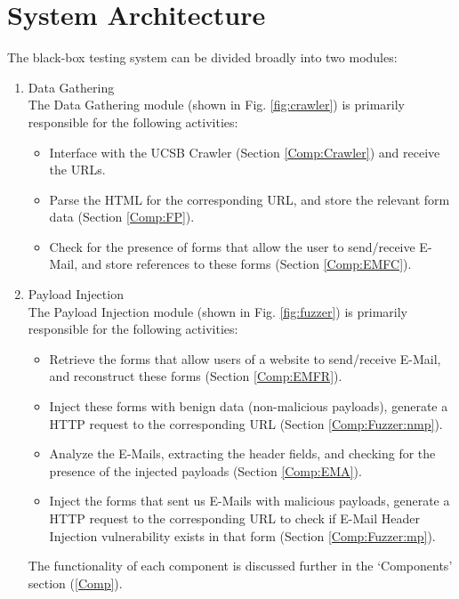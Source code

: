 \section{System Architecture}

The black-box testing system can be divided broadly into two modules:
\begin{enumerate}
	\item Data Gathering\\
		The Data Gathering module (shown in Fig. \ref{fig:crawler}) is primarily responsible for the following activities:
		\begin{itemize}
			\item Interface with the UCSB Crawler (Section \ref{Comp:Crawler}) and receive the URLs.
			\item Parse the HTML for the corresponding URL, and store the relevant form data (Section \ref{Comp:FP}).
			\item Check for the presence of forms that allow the user to send/receive E-Mail, and store references to these forms (Section \ref{Comp:EMFC}).
		\end{itemize} 
	\item Payload Injection\\
		The Payload Injection module (shown in Fig. \ref{fig:fuzzer}) is primarily responsible for the following activities:
		\begin{itemize}
			\item Retrieve the forms that allow users of a website to send/receive E-Mail, and reconstruct these forms (Section \ref{Comp:EMFR}).
			\item Inject these forms with benign data (non-malicious payloads), generate a HTTP request to the corresponding URL (Section \ref{Comp:Fuzzer:nmp}).
			\item Analyze the E-Mails, extracting the header fields, and checking for the presence of the injected payloads (Section \ref{Comp:EMA}).
			\item Inject the forms that sent us E-Mails with malicious payloads, generate a HTTP request to the corresponding URL to check if E-Mail Header Injection vulnerability exists in that form (Section \ref{Comp:Fuzzer:mp}).
		\end{itemize} 
	The functionality of each component is discussed further in the `Components' section (\ref{Comp}).
\end{enumerate}

